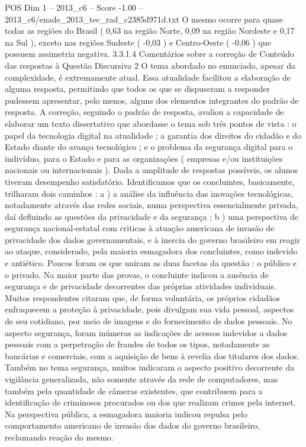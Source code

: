 \begin{textsample}{POS Dim 1 – 2013\_c6 – Score -1.00 – 2013\_c6/enade\_2013\_tec\_rad\_c2385d971d.txt}
O mesmo ocorre para quase todas as regiões do Brasil ( 0,63 na região Norte, 0,09 na região Nordeste e 0,17 na Sul ), exceto nas regiões Sudeste ( -0,03 ) e Centro-Oeste ( -0,06 ) que possuem assimetria negativa. 3.3.1.4 Comentários sobre a correção de Conteúdo das respostas à Questão Discursiva 2 O tema abordado no enunciado, apesar da complexidade, é extremamente atual.
Essa atualidade facilitou a elaboração de alguma resposta, permitindo que todos os que se dispuseram a responder pudessem apresentar, pelo menos, alguns dos elementos integrantes do padrão de resposta.
A correção, seguindo o padrão de resposta, avaliou a capacidade de elaborar um texto dissertativo que abordasse o tema sob três pontos de vista : o papel da tecnologia digital na atualidade ; a garantia dos direitos do cidadão e do Estado diante do avanço tecnológico ; e o problema da segurança digital para o indivíduo, para o Estado e para as organizações ( empresas e/ou instituições nacionais ou internacionais ).
Dada a amplitude de respostas possíveis, os alunos tiveram desempenho satisfatório.
Identificamos que os concluintes, basicamente, trilharam dois caminhos : a ) a análise da influência das inovações tecnológicas, notadamente através das redes sociais, numa perspectiva essencialmente privada, daí defluindo as questões da privacidade e da segurança ; b ) uma perspectiva de segurança nacional-estatal com criticas à atuação americana de invasão de privacidade dos dados governamentais, e à inercia do governo brasileiro em reagir ao ataque, considerado, pela maioria esmagadora dos concluintes, como indevido e antiético.
Poucos foram os que uniram as duas facetas da questão : o público e o privado.
Na maior parte das provas, o concluinte indicou a ausência de segurança e de privacidade decorrentes das próprias atividades individuais.
Muitos respondentes citaram que, de forma voluntária, os próprios cidadãos enfraquecem a proteção à privacidade, pois divulgam sua vida pessoal, aspectos de seu cotidiano, por meio de imagens e do fornecimento de dados pessoais.
No aspecto segurança, foram inúmeras as indicações de acessos indevidos a dados pessoais com a perpetração de fraudes de todos os tipos, notadamente as bancárias e comerciais, com a aquisição de bens à revelia dos titulares dos dados.
Também no tema segurança, muitos indicaram o aspecto positivo decorrente da vigilância generalizada, não somente através da rede de computadores, mas também pela quantidade de câmeras existentes, que contribuem para a identificação de criminosos procurados ou dos que realizam crimes pela internet.
Na perspectiva pública, a esmagadora maioria indicou repulsa pelo comportamento americano de invasão dos dados do governo brasileiro, reclamando reação do mesmo.

\end{textsample}
